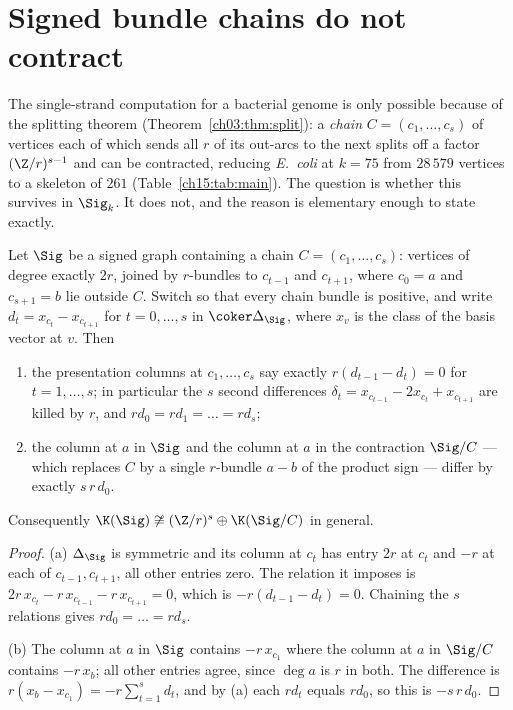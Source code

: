 \section{Signed bundle chains do not contract}\label{ch06:sec:series}

The single-strand computation for a bacterial genome is only possible because of the
splitting theorem (Theorem~\ref{ch03:thm:split}): a \emph{chain} $C=(c_1,\dots,c_s)$ of vertices each of which sends all
$r$ of its out-arcs to the next splits off a factor $(\Z/r)^{s-1}$ and can be contracted,
reducing \emph{E.\ coli} at $k=75$ from $28\,579$ vertices to a skeleton of $261$
(Table~\ref{ch15:tab:main}). The
question is whether this survives in $\Sig_k$. It does not, and the reason is elementary
enough to state exactly.

\begin{theorem}\label{ch06:thm:series}
Let $\Sig$ be a signed graph containing a chain $C=(c_1,\dots,c_s)$: vertices of degree
exactly $2r$, joined by $r$-bundles to $c_{t-1}$ and $c_{t+1}$, where $c_0=a$ and
$c_{s+1}=b$ lie outside $C$. Switch so that every chain bundle is positive, and write
$d_t=x_{c_t}-x_{c_{t+1}}$ for $t=0,\dots,s$ in $\coker\Delta_\Sig$, where $x_v$ is the class
of the basis vector at $v$. Then
\begin{enumerate}
\item[\rm(a)] the presentation columns at $c_1,\dots,c_s$ say exactly
      $r(d_{t-1}-d_t)=0$ for $t=1,\dots,s$; in particular the $s$ second differences
      $\delta_t=x_{c_{t-1}}-2x_{c_t}+x_{c_{t+1}}$ are killed by $r$, and
      $r d_0=r d_1=\dots=r d_s$;
\item[\rm(b)] the column at $a$ in $\Sig$ and the column at $a$ in the contraction $\Sig/C$
      --- which replaces $C$ by a single $r$-bundle $a\!-\!b$ of the product sign --- differ
      by exactly $s\,r\,d_0$.
\end{enumerate}
Consequently $\K(\Sig)\not\cong(\Z/r)^s\oplus\K(\Sig/C)$ in general.
\end{theorem}

\begin{proof}
(a) $\Delta_\Sig$ is symmetric and its column at $c_t$ has entry $2r$ at $c_t$ and $-r$ at
each of $c_{t-1},c_{t+1}$, all other entries zero. The relation it imposes is
$2r\,x_{c_t}-r\,x_{c_{t-1}}-r\,x_{c_{t+1}}=0$, which is $-r(d_{t-1}-d_t)=0$. Chaining the
$s$ relations gives $r d_0=\dots=r d_s$.

(b) The column at $a$ in $\Sig$ contains $-r\,x_{c_1}$ where the column at $a$ in $\Sig/C$
contains $-r\,x_b$; all other entries agree, since $\deg a$ is $r$ in both. The difference is
$r(x_b-x_{c_1})=-r\sum_{t=1}^s d_t$, and by (a) each $r d_t$ equals $r d_0$, so this is
$-s\,r\,d_0$.
\end{proof}

